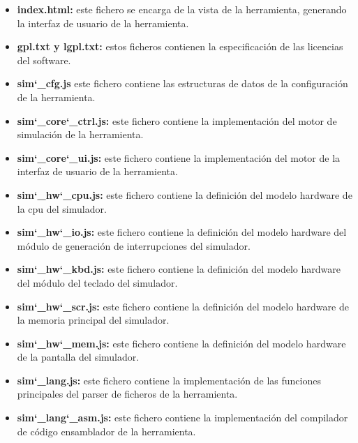 \begin{itemize}

\item \textbf{index.html: } este fichero se encarga de la vista de la herramienta, generando la interfaz de usuario de la herramienta.

\item \textbf{gpl.txt y lgpl.txt: } estos ficheros contienen la especificación de las licencias del software.

\item \textbf{sim\char`_cfg.js} este fichero contiene las estructuras de datos de la configuración de la herramienta.

\item \textbf{sim\char`_core\char`_ctrl.js:}  este fichero contiene la implementación del motor de simulación de la herramienta.

\item \textbf{sim\char`_core\char`_ui.js: } este fichero contiene la implementación del motor de la interfaz de usuario de la herramienta.

\item \textbf{sim\char`_hw\char`_cpu.js: } este fichero contiene la definición del modelo hardware de la cpu del simulador.

\item \textbf{sim\char`_hw\char`_io.js: } este fichero contiene la definición del modelo hardware del módulo de generación de interrupciones del simulador.

\item \textbf{sim\char`_hw\char`_kbd.js: } este fichero contiene la definición del modelo hardware del módulo del teclado del simulador.

\item \textbf{sim\char`_hw\char`_scr.js: } este fichero contiene la definición del modelo hardware de la memoria principal del simulador.

\item \textbf{sim\char`_hw\char`_mem.js: } este fichero contiene la definición del modelo hardware de la pantalla del simulador.

\item \textbf{sim\char`_lang.js: } este fichero contiene la implementación de las funciones principales del parser de ficheros de la herramienta.

\item \textbf{sim\char`_lang\char`_asm.js: } este fichero contiene la implementación del compilador de código ensamblador de la herramienta.


\end{itemize}
